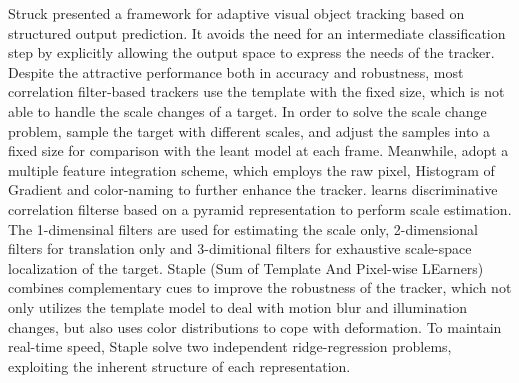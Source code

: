 \documentclass[review]{elsarticle}
\begin{document}
Struck \cite{Hare2011StruckSO} presented a framework for adaptive visual object tracking based on structured output prediction. It avoids the need for an intermediate classification step by explicitly allowing the output space to express the needs of the tracker.
Despite the attractive performance both in accuracy and robustness, most correlation filter-based trackers use the template with the fixed size, which is not able to handle the scale changes of a target. In order to solve the scale change problem, \cite{Li2014ASA} sample the target with different scales, and adjust the samples into a fixed size for comparison with the leant model at each frame. Meanwhile, \cite{Li2014ASA} adopt a multiple feature integration scheme, which employs the raw pixel, Histogram of Gradient \cite{Forsyth2014ObjectDW} and color-naming \cite{Weijer2009LearningCN} to further enhance the tracker.
\cite{Danelljan2017DiscriminativeSS} learns discriminative correlation filterse based on a pyramid representation to perform scale estimation. The 1-dimensinal filters are used for estimating the scale only, 2-dimensional filters for translation only and 3-dimitional filters for exhaustive scale-space localization of the target.
Staple (Sum of Template And  Pixel-wise LEarners) \cite{Bertinetto2016StapleC} combines complementary cues to improve the robustness of the tracker, which not only utilizes the template model to deal with motion blur and illumination changes, but also uses color distributions to cope with deformation. To maintain real-time speed, Staple solve two independent ridge-regression problems, exploiting the inherent structure of each representation.
\end{document}
